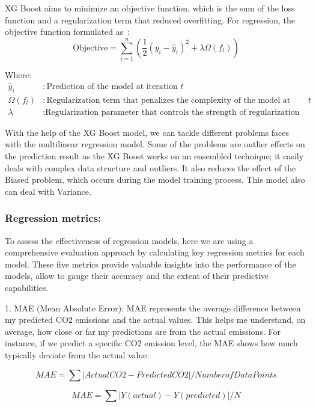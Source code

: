 \documentclass[12pt, a4paper,oneside]{book}
\numberwithin{equation}{section}
\begin{document}
XG Boost aims to minimize an objective function, which is the sum of the loss function and a regularization term that reduced overfitting. For regression, the objective function formulated as~\cite{ref16}:
\[
\text{Objective} = \sum_{i=1}^{n} \left( \frac{1}{2} (y_i - \hat{y}_i)^2 + \lambda \Omega(f_t) \right)
\]

Where:
\begin{align*}
\hat{y}_i &: \text{Prediction of the model at iteration } t \\
\Omega(f_t) &: \text{Regularization term that penalizes the complexity of the model at iteration } t \\
\lambda &: \text{Regularization parameter that controls the strength of regularization}
\end{align*}


With the help of the XG Boost model, we can tackle different problems faces with the multilinear regression model. Some of the problems are outlier effects on the prediction result as the XG Boost works on an ensembled technique; it easily deals with complex data structure and outliers. It also reduces the effect of the Biased problem, which occurs during the model training process. This model  also can deal with Variance.


\subsubsection{ Regression metrics:}

To assess the effectiveness of regression models, here we are using a comprehensive evaluation approach by calculating key regression metrics for each model. These five metrics provide valuable insights into the performance of the models, allow to gauge their accuracy and the extent of their predictive capabilities.

1. MAE (Mean Absolute Error): MAE represents the average difference between my predicted CO2 emissions and the actual values. This helps me understand, on average, how close or far my predictions are from the actual emissions. For instance, if we predict a specific CO2 emission level, the MAE shows how much typically deviate from the actual value.~\cite{ref13}


\begin{equation}
    MAE = \sum |Actual CO2 - Predicted CO2| / Number of Data Points
\end{equation}

\begin{equation}
    MAE = \sum |Y(actual) - Y(predicted)| / N
\end{equation}
\end{document}
